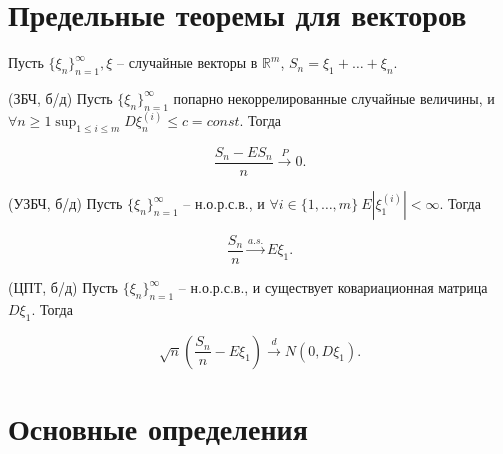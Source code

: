 \section{Предельные теоремы для векторов}

Пусть $\displaystyle \{\xi _{n}\}_{n=1}^{\infty } ,\xi $ -- случайные векторы в $\displaystyle \mathbb{R}^{m}$, $\displaystyle S_{n} =\xi _{1} +\dotsc +\xi _{n}$.
\begin{theorem}
	(ЗБЧ, б/д) Пусть $\displaystyle \{\xi _{n}\}_{n=1}^{\infty}$ попарно некоррелированные случайные величины, и $\displaystyle \forall n \ge 1 \sup_{1\le i\le m} D\xi _{n}^{( i)} \leqslant c=const$. Тогда
	
	
	\begin{equation*}
		\frac{S_{n} -ES_{n}}{n}\xrightarrow{P} 0.
	\end{equation*}
\end{theorem}
\begin{theorem}
	(УЗБЧ, б/д) Пусть $\displaystyle \{\xi _{n}\}_{n=1}^{\infty }$ -- н.о.р.с.в., и $\displaystyle \forall i\in \{1,\dotsc ,m\} \ E\left| \xi _{1}^{( i)}\right| < \infty $. Тогда
	
	
	\begin{equation*}
		\frac{S_{n}}{n}\xrightarrow{a.s.} E\xi_{1} .
	\end{equation*}
\end{theorem}
\begin{theorem}
	(ЦПТ, б/д) Пусть $\displaystyle \{\xi _{n}\}_{n=1}^{\infty }$ -- н.о.р.с.в., и существует ковариационная матрица $\displaystyle D\xi _{1}$. Тогда
	
	
	\begin{equation*}
		\sqrt{n}\left(\frac{S_{n}}{n} -E\xi_{1}\right)\xrightarrow{d} N( 0,D\xi_{1}) .
	\end{equation*}
\end{theorem}

\section{Основные определения}

